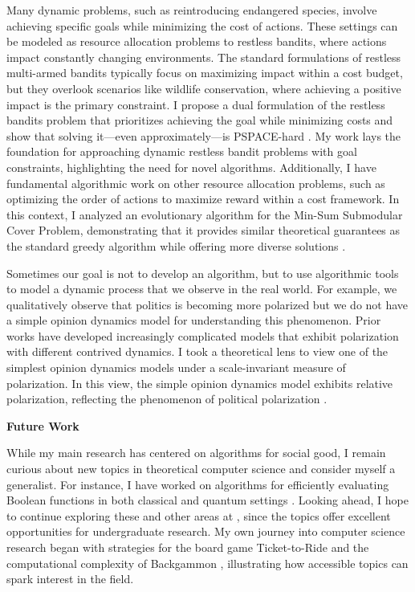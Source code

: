 \documentclass[11pt]{article}
\begin{document}
{Many dynamic problems, such as reintroducing endangered species, involve achieving specific goals while minimizing the cost of actions. These settings can be modeled as resource allocation problems to restless bandits, where actions impact constantly changing environments. The standard formulations of restless multi-armed bandits typically focus on maximizing impact within a cost budget, but they overlook scenarios like wildlife conservation, where achieving a positive impact is the primary constraint. I propose a dual formulation of the restless bandits problem that prioritizes achieving the goal while minimizing costs and show that solving it—even approximately—is PSPACE-hard \cite{witter2024minimizing}. My work lays the foundation for approaching dynamic restless bandit problems with goal constraints, highlighting the need for novel algorithms. Additionally, I have fundamental algorithmic work on other resource allocation problems, such as optimizing the order of actions to maximize reward within a cost framework. In this context, I analyzed an evolutionary algorithm for the Min-Sum Submodular Cover Problem, demonstrating that it provides similar theoretical guarantees as the standard greedy algorithm while offering more diverse solutions \cite{hellerstein2022local}.

Sometimes our goal is not to develop an algorithm, but to use algorithmic tools to model a dynamic process that we observe in the real world. For example, we qualitatively observe that politics is becoming more polarized but we do not have a simple opinion dynamics model for understanding this phenomenon. Prior works have developed increasingly complicated models that exhibit polarization with different contrived dynamics. I took a theoretical lens to view one of the simplest opinion dynamics models under a scale-invariant measure of polarization. In this view, the simple opinion dynamics model exhibits relative polarization, reflecting the phenomenon of political polarization \cite{musco2022quantify}.

\begin{center}
{\large \textbf{Future Work}}
\end{center}

While my main research has centered on algorithms for social good, I remain curious about new topics in theoretical computer science and consider myself a generalist. For instance, I have worked on algorithms for efficiently evaluating Boolean functions in both classical \cite{hellerstein2022adaptivity} and quantum settings \cite{czekanski2023robust,kimmel2021query,delorenzo2019applications}. Looking ahead, I hope to continue exploring these and other areas at \school, since the topics offer excellent opportunities for undergraduate research. My own journey into computer science research began with strategies for the board game Ticket-to-Ride \cite{witter2020applications} and the computational complexity of Backgammon \cite{witter2021backgammon}, illustrating how accessible topics can spark interest in the field.

}
\end{document}
